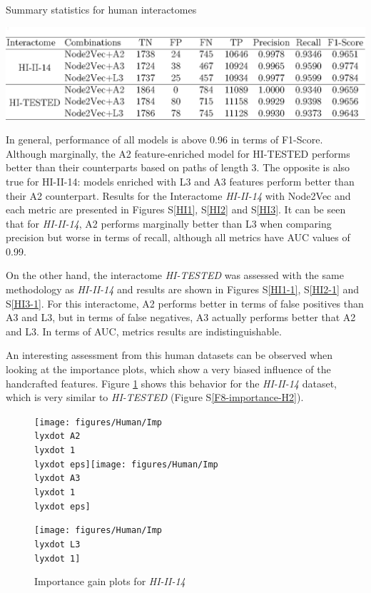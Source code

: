 \begin{table}
\caption{\label{T1}Summary statistics for human interactomes}
\includegraphics[width=1\columnwidth]{figures/T1}
\end{table}

In general, performance of all models is above 0.96 in terms of F1-Score.
Although marginally, the A2 feature-enriched model for HI-TESTED performs
better than their counterparts based on paths of length 3. The opposite
is also true for HI-II-14: models enriched with L3 and A3 features
perform better than their A2 counterpart. Results for the Interactome
\emph{HI-II-14} with Node2Vec and each metric are presented in Figures
S\ref{HI1}, S\ref{HI2} and S\ref{HI3}. It can be seen that for
\emph{HI-II-14}, A2 performs marginally better than L3 when comparing
precision but worse in terms of recall, although all metrics have
AUC values of 0.99.

On the other hand, the interactome \emph{HI-TESTED} was assessed with
the same methodology as \emph{HI-II-14} and results are shown in Figures
S\ref{HI1-1}, S\ref{HI2-1} and S\ref{HI3-1}. For this interactome,
A2 performs better in terms of false positives than A3 and L3, but
in terms of false negatives, A3 actually performs better that A2 and
L3. In terms of AUC, metrics results are indistinguishable. 

An interesting assessment from this human datasets can be observed
when looking at the importance plots, which show a very biased influence
of the handcrafted features. Figure \ref{F8-importance-H1} shows
this behavior for the \emph{HI-II-14} dataset, which is very similar
to \emph{HI-TESTED} (Figure S\ref{F8-importance-H2}).

\begin{figure}[h]
\noindent \begin{centering}
\caption{\label{F8-importance-H1}Importance gain plots for \emph{HI-II-14}}
\par\end{centering}
\begin{centering}
\texttt{[image: figures/Human/Imp\\lyxdot A2\\lyxdot 1\\lyxdot eps]}\texttt{[image: figures/Human/Imp\\lyxdot A3\\lyxdot 1\\lyxdot eps]}
\par\end{centering}
\centering{}\texttt{[image: figures/Human/Imp\\lyxdot L3\\lyxdot 1]}
\end{figure}